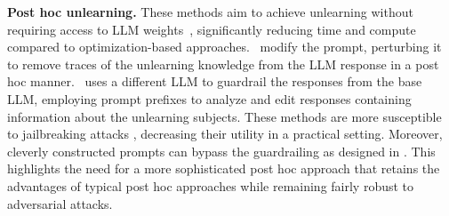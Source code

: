 \textbf{Post hoc unlearning.} These methods aim to achieve unlearning without requiring access to LLM weights~\cite{pawelczyk2023context}, significantly reducing time and compute compared to optimization-based approaches.~\citet{pawelczyk2023context,kuwana2024blackboxforgetting,muresanu2024unlearnablealgorithmsincontextlearning} modify the prompt, perturbing it to remove traces of the unlearning knowledge from the LLM response in a post hoc manner.~\citet{thaker2024guardrail} uses a different LLM to guardrail the responses from the base LLM, employing prompt prefixes to analyze and edit responses containing information about the unlearning subjects. These methods are more susceptible to jailbreaking attacks \cite{anil2024many, lynch2024eight, mangaokar2024prppropagatinguniversalperturbations, rao2024trickingllmsdisobedienceformalizing}, decreasing their utility in a practical setting. Moreover, cleverly constructed prompts can bypass the guardrailing as designed in \citet{thaker2024guardrail}. This highlights the need for a more sophisticated post hoc approach that retains the advantages of typical post hoc approaches while remaining fairly robust to adversarial attacks.\par



